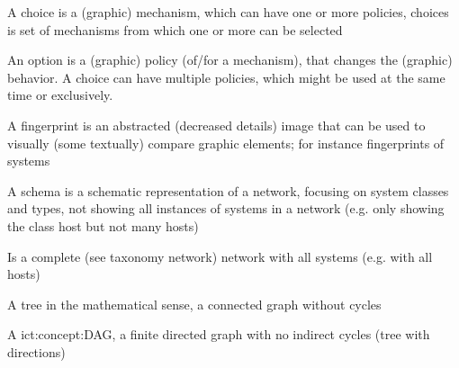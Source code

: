 \begin{description}[font=\normalfont,itemsep=0pt]
    \item[Choice]
        A choice is a (graphic) mechanism, which can have one or more policies, choices is set of mechanisms from which one or more can be selected

    \item[Option]
        An option is a (graphic) policy (of/for a mechanism), that changes the (graphic) behavior.
        A choice can have multiple policies, which might be used at the same time or exclusively.

    \item[Fingerprint]
        A fingerprint is an abstracted (decreased details) image that can be used to visually (some textually) compare graphic elements;
        for instance fingerprints of systems

    \item[(Network) Schema]
        A schema is a schematic representation of a network, focusing on system classes and types,
        not showing all instances of systems in a network (e.g. only showing the class host but not many hosts)

    \item[Network]
        Is a complete (see taxonomy network) network with all systems (e.g. with all hosts)

    \item[Tree]
        A tree in the mathematical sense, a connected graph without cycles

    \item[\acs{ict:concept:DAG}]
        A \acl{ict:concept:DAG}, a finite directed graph with no indirect cycles (tree with directions)

\end{description}